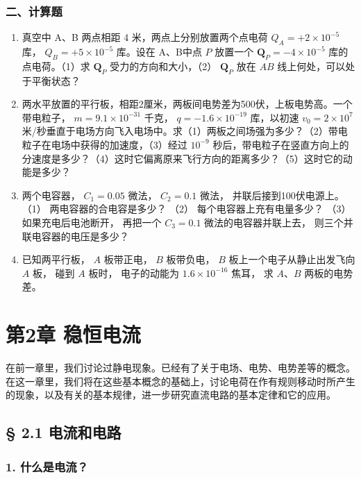 \subsection{二、计算题}\label{ux4e8cux8ba1ux7b97ux9898}

\begin{enumerate}
\def\labelenumi{\arabic{enumi}.}
\item
  真空中 A、B 两点相距 4 米，两点上分别放置两个点电荷
  \(Q_{A} = +2 \times 10^{-5}\) 库， \(Q_{B} = +5 \times 10^{-5}\)
  库。设在 A、B中点 \(P\) 放置一个 \(\mathbf{Q}_P = -4\times 10^{-5}\)
  库的点电荷。（1）求 \(\mathbf{Q}_P\) 受力的方向和大小，（2）
  \(\mathbf{Q}_P\) 放在 \(AB\) 线上何处，可以处于平衡状态？
\item
  两水平放置的平行板，相距2厘米，两板间电势差为500伏，上板电势高。一个带电粒子，
  \(m=9.1\times10^{-31}\) 千克， \(q=-1.6\times10^{-19}\) 库，以初速
  \(v_{0}=2\times10^{7}\)
  米/秒垂直于电场方向飞入电场中。求（1）两板之间场强为多少？（2）带电粒子在电场中获得的加速度，（3）经过
  \(10^{-9}\)
  秒后，带电粒子在竖直方向上的分速度是多少？（4）这时它偏离原来飞行方向的距离多少？（5）这时它的动能是多少？
\item
  两个电容器， \(C_1 = 0.05\) 微法， \(C_2 = 0.1\) 微法，
  并联后接到100伏电源上。 （1） 两电容器的合电容是多少？ （2）
  每个电容器上充有电量多少？ （3） 如果充电后电池断开， 再把一个
  \(C_3 = 0.1\) 微法的电容器并联上去， 则三个并联电容器的电压是多少？
\item
  已知两平行板， \(A\) 板带正电， \(B\) 板带负电， \(B\)
  板上一个电子从静止出发飞向 \(A\) 板， 碰到 \(A\) 板时， 电子的动能为
  \(1.6 \times 10^{-16}\) 焦耳， 求 \(A\)、\(B\) 两板的电势差。
\end{enumerate}

\chapter{第2章 稳恒电流}\label{ux7b2c2ux7ae0-ux7a33ux6052ux7535ux6d41}

在前一章里，我们讨论过静电现象。已经有了关于电场、电势、电势差等的概念。在这一章里，我们将在这些基本概念的基础上，讨论电荷在作有规则移动时所产生的现象，以及有关的基本规律，进一步研究直流电路的基本定律和它的应用。

\section{§ 2.1 电流和电路}\label{ux7535ux6d41ux548cux7535ux8def}

\subsection{1. 什么是电流？}\label{ux4ec0ux4e48ux662fux7535ux6d41}

